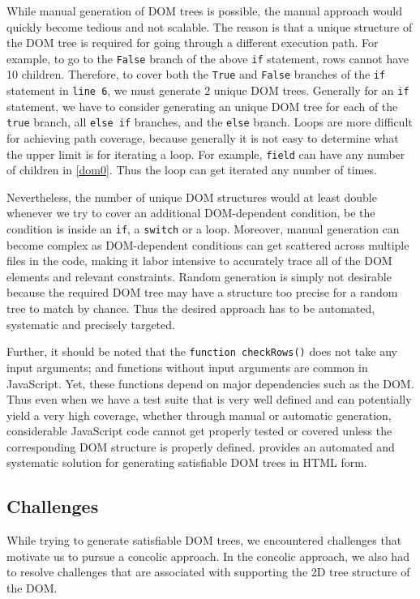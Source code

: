 While manual generation of DOM trees is possible, the manual approach would quickly become tedious and not scalable.  
The reason is that a unique structure of the DOM tree is required for going through a different execution path.  
For example, to go to the {\tt False} branch of the above {\tt if} statement, rows cannot have 10 children.
Therefore, to cover both the {\tt True} and {\tt False} branches of the {\tt if} statement in {\tt line 6}, we must generate 2 unique DOM trees.  
Generally for an {\tt if} statement, we have to consider generating an unique DOM tree for each of the {\tt true} branch,  all {\tt else if} branches, and the {\tt else} branch.  
Loops are more difficult for achieving path coverage, because generally it is not easy to determine what the upper limit is for iterating a loop.  
For example, {\tt field} can have any number of children in \autoref{dom0}.  Thus the loop can get iterated any number of times.  


Nevertheless, the number of unique DOM structures would at least double whenever we try to cover an additional DOM-dependent condition, be the condition is inside an {\tt if}, a {\tt switch} or a loop.  
Moreover, manual generation can become complex as DOM-dependent conditions can get scattered across multiple files in the code, making it labor intensive to accurately trace all of the DOM elements and relevant constraints.  
Random generation is simply not desirable because the required DOM tree may have a structure too precise for a random tree to match by chance.  
Thus the desired approach has to be automated, systematic and precisely targeted.

Further, it should be noted that the {\tt function checkRows()} does not take any input arguments; and functions without input arguments are common in JavaScript.
Yet, these functions depend on major dependencies such as the DOM.
Thus even when we have a test suite that is very well defined and can potentially yield a very high coverage, whether through manual or automatic generation, 
considerable JavaScript code cannot get properly tested or covered unless the corresponding DOM structure is properly defined.  
\tool provides an automated and systematic solution for generating satisfiable DOM trees in HTML form.  



\subsection{Challenges}
While trying to generate satisfiable DOM trees, we encountered challenges that motivate us to pursue a concolic approach.  
In the concolic approach, we also had to resolve challenges that are associated with supporting the 2D tree structure of the DOM.  

